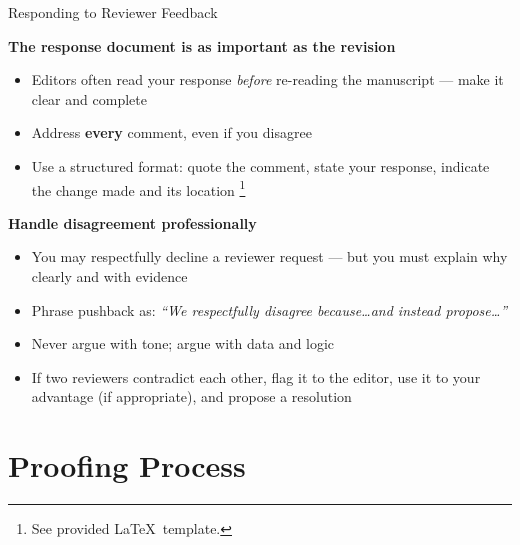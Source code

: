 \documentclass{beamer}
\begin{document}
\begin{frame}{Responding to Reviewer Feedback}

  \footnotesize
  \textbf{The response document is as important as the revision}
  \begin{itemize}
    \item Editors often read your response \emph{before} re-reading
      the manuscript --- make it clear and complete
    \item Address \textbf{every} comment, even if you disagree
    \item Use a structured format: quote the comment, state your
      response, indicate the change made and its location%
      \footnote{\scriptsize See provided \LaTeX\ template.}
  \end{itemize}

  \medskip
  \textbf{Handle disagreement professionally}
  \begin{itemize}
    \item You may respectfully decline a reviewer request ---
      but you must explain why clearly and with evidence
    \item Phrase pushback as: \emph{``We respectfully disagree
      because\ldots and instead propose\ldots''}
    \item Never argue with tone; argue with data and logic
    \item If two reviewers contradict each other, flag it to
      the editor, use it to your advantage (if appropriate), and propose a resolution
  \end{itemize}

\end{frame}




\section{Proofing Process}
\end{document}
